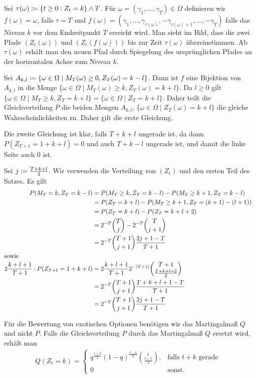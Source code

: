 \documentclass[a4paper,twoside,DIV15,BCOR12mm]{scrbook}
\begin{document}
\begin{beweis}
Sei $\tau(\omega) \da \{ t\ge 0: Z_t = k\} \wedge T$. Für $\omega=(\gamma_1,\ldots,\gamma_T)\in \Omega$ definieren wir $f(\omega) = \omega$, falls $\tau = T$ und $f(\omega) = (\gamma_1,\ldots,\gamma_{\tau(\omega)},-\gamma_{\tau(\omega)+1},\ldots,-\gamma_T)$ falls das Niveau $k$ vor dem Endzeitpunkt $T$ erreicht wird. Man sieht im Bild, dass die zwei Pfade $(Z_t(\omega))$ und $(Z_t(f(\omega)))$ bis zur Zeit $\tau(\omega)$ übereinstimmen. Ab $\tau(\omega)$ erhält man den neuen Pfad durch Spiegelung des ursprünglichen Pfades an der horizontalen Achse zum Niveau $k$.

Sei $A_{k,l} \da \{\omega\in\Omega\mid M_T(\omega) \ge 0, Z_T(\omega) = k -l\}$. Dann ist $f$ eine Bijektion von $A_{k,l}$ in die Menge $\{\omega\in\Omega\mid M_T(\omega) \ge k, Z_T(\omega) = k + l\}$. Da $l\ge 0$ gilt $\{\omega\in\Omega\mid M_T\ge k, Z_T = k+l\} = \{\omega\in\Omega\mid Z_T = k+l\}$. Daher teilt die Gleichverteilung $P$ die beiden Mengen $A_{k,l}$, $\{\omega\in\Omega\mid Z_T(\omega) = k+l\}$ die gleiche Wahrscheinlichkeiten zu. Daher gilt die erste Gleichung.

Die zweite Gleichung ist klar, falls $T + k + l$ ungerade ist, da dann $P(Z_{T+1} = 1 + k + l) = 0$ und auch $T+k-l$ ungerade ist, und damit die linke Seite auch $0$ ist.

Sei $j \da\frac{T+k+l}2$.  Wir verwenden die Verteilung von $(Z_t)$ und den ersten Teil des Satzes.  Es gilt
\begin{align*}
P(M_T=k,Z_T = k-l) &= P(M_T\ge k, Z_T = k-l) - P(M_T\ge k+1 , Z_T = k-l) \\
&= P(Z_T = k+l) - P(M_T \ge k+1, Z_T=(k+1)-(l+1)) \\
&= P(Z_T = k+l) - P(Z_T = k+l+2) \\
&= 2^{-T} \binom{T}{j} - 2^{-T} \binom{T}{j+1} \\
&= 2^{-T} \binom{T+1}{j+1} \frac{2j+1-T}{T+1} \\
\intertext{sowie}
2 \frac{k+l+1}{T+1} \cdot P (Z_{T+1} = 1 + k +l) &= 2\frac{k+l+1}{T+1} 2^{-(T+1)} \binom{T+1}{\frac{T+k+l+2}2} \\
&= 2^{-T} \binom{T+1}{j+1}\frac{T+k+l+1-T}{T+1}  \\
&= 2^{-T} \binom{T+1}{j+1}\frac{2j+1-T}{T+1} 
\end{align*}
\end{beweis}

Für die Bewertung von exotischen Optionen benötigen wir das Martingalmaß $Q$ und nicht $P$. Falls die Gleichverteilung $P$ durch das Martingalmaß $Q$ ersetzt wird, erhält man
\begin{align*}
Q(Z_t = k ) =
\begin{cases}
q^{\frac{t+k}2} (1-q)^{\frac{t-k}2} \binom{t}{\frac{t+k}2}, &\text{falls $t+k$ gerade}\\
0 &\text{sonst.}
\end{cases}
\end{align*}
\end{document}
